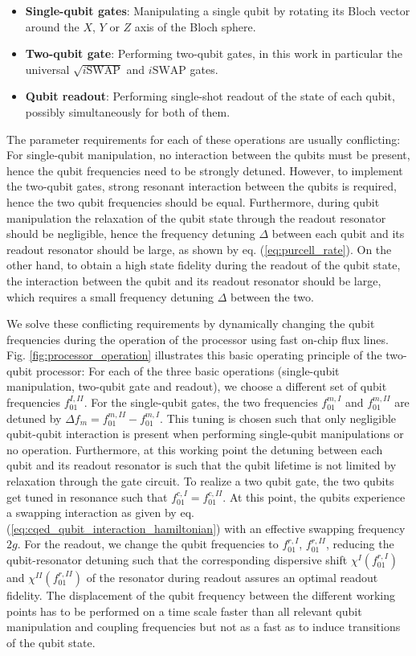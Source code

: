 \begin{itemize}
\item \textbf{Single-qubit gates}: Manipulating a single qubit by rotating its Bloch vector around the $X$, $Y$ or $Z$ axis of the Bloch sphere.
\item \textbf{Two-qubit gate}: Performing two-qubit gates, in this work in particular the universal $\sqrt{i\mathrm{SWAP}}$ and $i\mathrm{SWAP}$ gates.
\item \textbf{Qubit readout}: Performing single-shot readout of the state of each qubit, possibly simultaneously for both of them.
\end{itemize}
%
The parameter requirements for each of these operations are usually conflicting: For single-qubit manipulation, no interaction between the qubits must be present, hence the qubit frequencies need to be strongly detuned. However, to implement the two-qubit gates, strong resonant interaction between the qubits is required, hence the two qubit frequencies should be equal. Furthermore, during qubit manipulation the relaxation of the qubit state through the readout resonator should be negligible, hence the frequency detuning $\Delta$ between each qubit and its readout resonator should be large, as shown by eq. (\ref{eq:purcell_rate}). On the other hand, to obtain a high state fidelity during the readout of the qubit state, the interaction between the qubit and its readout resonator should be large, which requires a small frequency detuning $\Delta$ between the two.

\smallskip

We solve these conflicting requirements by dynamically changing the qubit frequencies during the operation of the processor using fast on-chip flux lines. Fig. \ref{fig:processor_operation} illustrates this basic operating principle of the two-qubit processor: For each of the three basic operations (single-qubit manipulation, two-qubit gate and readout), we choose a different set of qubit frequencies $f_{01}^{I,II}$. For the single-qubit gates, the two frequencies $f_{01}^{m,I}$ and $f_{01}^{m,II}$ are detuned by $\Delta f_m = f_{01}^{m,II}-f_{01}^{m,I}$. This tuning is chosen such that only negligible qubit-qubit interaction is present when performing single-qubit manipulations or no operation. Furthermore, at this working point the detuning between each qubit and its readout resonator is such that the qubit lifetime is not limited by relaxation through the gate circuit. To realize a two qubit gate, the two qubits get tuned in resonance such that $f_{01}^{c,I} = f_{01}^{c,II}$. At this point, the qubits experience a swapping interaction as given by eq. (\ref{eq:cqed_qubit_interaction_hamiltonian}) with an effective swapping frequency $2g$. For the readout, we change the qubit frequencies to $f_{01}^{r,I}$, $f_{01}^{r,II}$, reducing the qubit-resonator detuning such that the corresponding dispersive shift $\chi^I(f_{01}^{r,I})$ and $\chi^{II}(f_{01}^{r,II})$ of the resonator during readout assures an optimal readout fidelity. The displacement of the qubit frequency between the different working points has to be performed on a time scale faster than all relevant qubit manipulation and coupling frequencies but not as a fast as to induce transitions of the qubit state.

